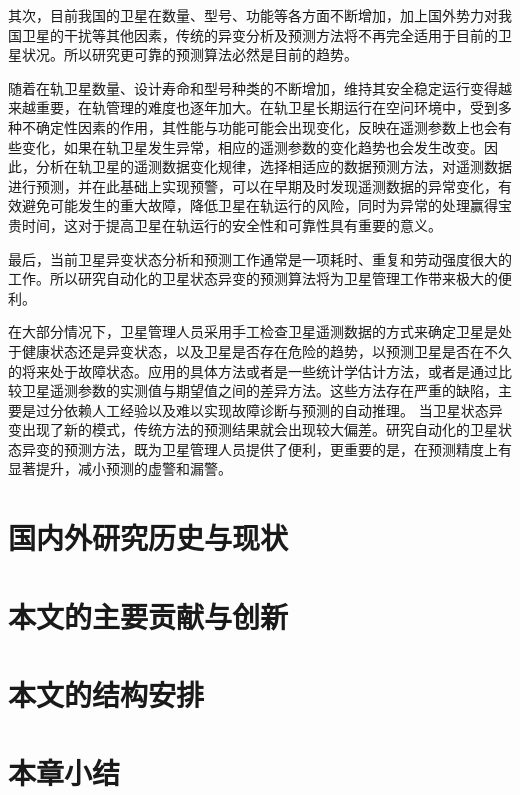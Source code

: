 其次，目前我国的卫星在数量、型号、功能等各方面不断增加，加上国外势力对我国卫星的干扰等其他因素，传统的异变分析及预测方法将不再完全适用于目前的卫星状况。所以研究更可靠的预测算法必然是目前的趋势。

随着在轨卫星数量、设计寿命和型号种类的不断增加，维持其安全稳定运行变得越来越重要，在轨管理的难度也逐年加大。在轨卫星长期运行在空问环境中，受到多种不确定性因素的作用，其性能与功能可能会出现变化，反映在遥测参数上也会有些变化，如果在轨卫星发生异常，相应的遥测参数的变化趋势也会发生改变。因此，分析在轨卫星的遥测数据变化规律，选择相适应的数据预测方法，对遥测数据进行预测，并在此基础上实现预警，可以在早期及时发现遥测数据的异常变化，有效避免可能发生的重大故障，降低卫星在轨运行的风险，同时为异常的处理赢得宝贵时间，这对于提高卫星在轨运行的安全性和可靠性具有重要的意义。

最后，当前卫星异变状态分析和预测工作通常是一项耗时、重复和劳动强度很大的工作。所以研究自动化的卫星状态异变的预测算法将为卫星管理工作带来极大的便利。

在大部分情况下，卫星管理人员采用手工检查卫星遥测数据的方式来确定卫星是处于健康状态还是异变状态，以及卫星是否存在危险的趋势，以预测卫星是否在不久的将来处于故障状态。应用的具体方法或者是一些统计学估计方法，或者是通过比较卫星遥测参数的实测值与期望值之间的差异方法。这些方法存在严重的缺陷，主要是过分依赖人工经验以及难以实现故障诊断与预测的自动推理。
当卫星状态异变出现了新的模式，传统方法的预测结果就会出现较大偏差。研究自动化的卫星状态异变的预测方法，既为卫星管理人员提供了便利，更重要的是，在预测精度上有显著提升，减小预测的虚警和漏警。

\section{国内外研究历史与现状}


\section{本文的主要贡献与创新}


\section{本文的结构安排}


\section{本章小结}
